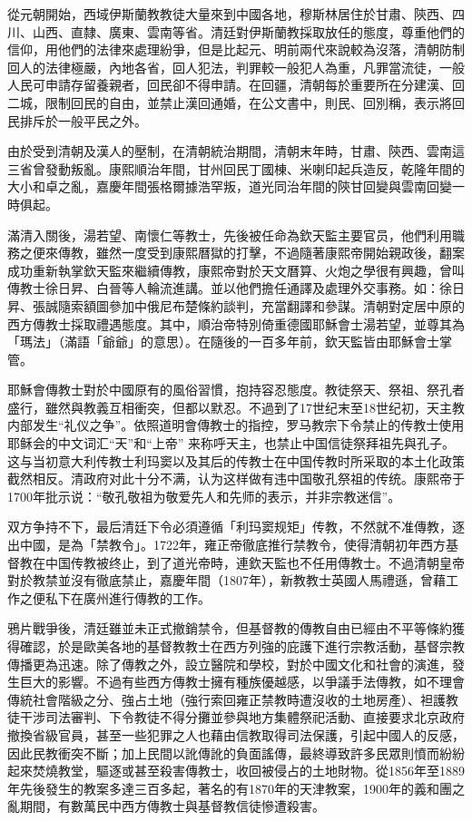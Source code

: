 從元朝開始，西域伊斯蘭教教徒大量來到中國各地，穆斯林居住於甘肅、陝西、四川、山西、直隸、廣東、雲南等省。清廷對伊斯蘭教採取放任的態度，尊重他們的信仰，用他們的法律來處理紛爭，但是比起元、明前兩代來說較為沒落，清朝防制回人的法律極嚴，內地各省，回人犯法，判罪較一般犯人為重，凡罪當流徒，一般人民可申請存留養親者，回民卻不得申請。在回疆，清朝每於重要所在分建漢、回二城，限制回民的自由，並禁止漢回通婚，在公文書中，則民、回別稱，表示將回民排斥於一般平民之外。

由於受到清朝及漢人的壓制，在清朝統治期間，清朝末年時，甘肅、陝西、雲南這三省曾發動叛亂。康熙順治年間，甘州回民丁國棟、米喇印起兵造反，乾隆年間的大小和卓之亂，嘉慶年間張格爾據浩罕叛，道光同治年間的陝甘回變與雲南回變一時俱起。

滿清入關後，湯若望、南懷仁等教士，先後被任命為欽天監主要官员，他們利用職務之便來傳教，雖然一度受到康熙曆獄的打擊，不過隨著康熙帝開始親政後，翻案成功重新執掌欽天監來繼續傳教，康熙帝對於天文曆算、火炮之學很有興趣，曾叫傳教士徐日昇、白晉等人輪流進講。並以他們擔任通譯及處理外交事務。如：徐日昇、張誠隨索額圖參加中俄尼布楚條約談判，充當翻譯和參謀。清朝對定居中原的西方傳教士採取禮遇態度。其中，順治帝特別倚重德國耶穌會士湯若望，並尊其為「瑪法」（滿語「爺爺」的意思）。在隨後的一百多年前，欽天監皆由耶穌會士掌管。

耶穌會傳教士對於中國原有的風俗習慣，抱持容忍態度。教徒祭天、祭祖、祭孔者盛行，雖然與教義互相衝突，但都以默忍。不過到了17世纪末至18世纪初，天主教内部发生“礼仪之争”。依照道明會傳教士的指控，罗马教宗下令禁止的传教士使用耶稣会的中文词汇“天”和“上帝” 来称呼天主，也禁止中国信徒祭拜祖先與孔子。这与当初意大利传教士利玛窦以及其后的传教士在中国传教时所采取的本土化政策截然相反。清政府对此十分不满，认为这样做有违中国敬孔祭祖的传统。康熙帝于1700年批示说：“敬孔敬祖为敬爱先人和先师的表示，并非宗教迷信”。

双方争持不下，最后清廷下令必須遵循「利玛窦规矩」传教，不然就不准傳教，逐出中國，是為「禁教令」。1722年，雍正帝徹底推行禁教令，使得清朝初年西方基督教在中国传教被终止，到了道光帝時，連欽天監也不任用傳教士。不過清朝皇帝對於教禁並沒有徹底禁止，嘉慶年間（1807年），新教教士英國人馬禮遜，曾藉工作之便私下在廣州進行傳教的工作。

鴉片戰爭後，清廷雖並未正式撤銷禁令，但基督教的傳教自由已經由不平等條約獲得確認，於是歐美各地的基督教教士在西方列強的庇護下進行宗教活動，基督宗教傳播更為迅速。除了傳教之外，設立醫院和學校，對於中國文化和社會的演進，發生巨大的影響。不過有些西方傳教士擁有種族優越感，以爭議手法傳教，如不理會傳統社會階級之分、強占土地（強行索回雍正禁教時遭沒收的土地房產）、袒護教徒干涉司法審判、下令教徒不得分攤並參與地方集體祭祀活動、直接要求北京政府撤換省級官員，甚至一些犯罪之人也藉由信教取得司法保護，引起中國人的反感，因此民教衝突不斷；加上民間以訛傳訛的負面謠傳，最終導致許多民眾則憤而紛紛起來焚燒教堂，驅逐或甚至殺害傳教士，收回被侵占的土地財物。從1856年至1889年先後發生的教案多達三百多起，著名的有1870年的天津教案，1900年的義和團之亂期間，有數萬民中西方傳教士與基督教信徒慘遭殺害。

